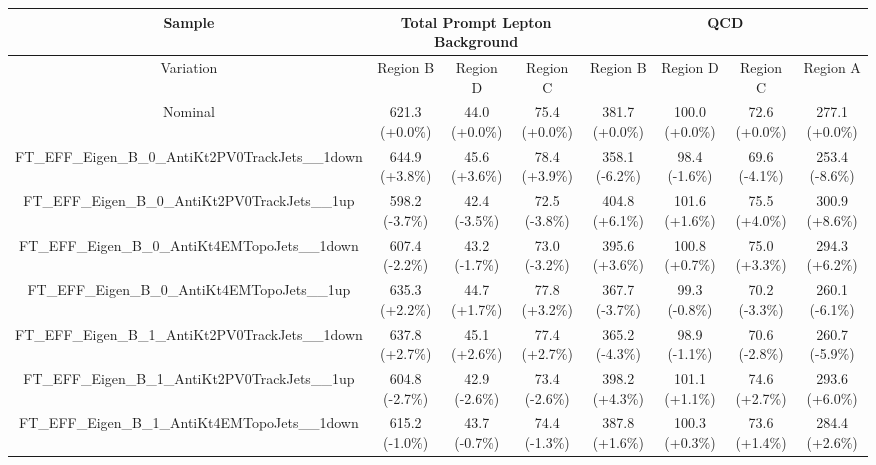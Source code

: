 \begin{table}[htbp!]
\begin{tiny}
\begin{center}
\begin{tabular}{c|c|c|c||c|c|c|c}
Sample                                                          &\multicolumn{3}{c||}{Total Prompt Lepton Background}      &\multicolumn{4}{c}{QCD}                                                  \\
\hline  
Variation                                                       & Region B       & Region D         & Region C           & Region B        & Region D         & Region C          & Region A         \\ 
\hline  
Nominal                                                      & 621.3     (+0.0\%) & 44.0      (+0.0\%) & 75.4      (+0.0\%) & 381.7     (+0.0\%) & 100.0     (+0.0\%) & 72.6      (+0.0\%) & 277.1     (+0.0\%) \\ 
\hline
FT\_EFF\_Eigen\_B\_0\_AntiKt2PV0TrackJets\_\_1down           & 644.9     (+3.8\%) & 45.6      (+3.6\%) & 78.4      (+3.9\%) & 358.1     (-6.2\%) & 98.4      (-1.6\%) & 69.6      (-4.1\%) & 253.4     (-8.6\%) \\ 
FT\_EFF\_Eigen\_B\_0\_AntiKt2PV0TrackJets\_\_1up             & 598.2     (-3.7\%) & 42.4      (-3.5\%) & 72.5      (-3.8\%) & 404.8     (+6.1\%) & 101.6     (+1.6\%) & 75.5      (+4.0\%) & 300.9     (+8.6\%) \\ 
FT\_EFF\_Eigen\_B\_0\_AntiKt4EMTopoJets\_\_1down             & 607.4     (-2.2\%) & 43.2      (-1.7\%) & 73.0      (-3.2\%) & 395.6     (+3.6\%) & 100.8     (+0.7\%) & 75.0      (+3.3\%) & 294.3     (+6.2\%) \\ 
FT\_EFF\_Eigen\_B\_0\_AntiKt4EMTopoJets\_\_1up               & 635.3     (+2.2\%) & 44.7      (+1.7\%) & 77.8      (+3.2\%) & 367.7     (-3.7\%) & 99.3      (-0.8\%) & 70.2      (-3.3\%) & 260.1     (-6.1\%) \\ 
FT\_EFF\_Eigen\_B\_1\_AntiKt2PV0TrackJets\_\_1down           & 637.8     (+2.7\%) & 45.1      (+2.6\%) & 77.4      (+2.7\%) & 365.2     (-4.3\%) & 98.9      (-1.1\%) & 70.6      (-2.8\%) & 260.7     (-5.9\%) \\ 
FT\_EFF\_Eigen\_B\_1\_AntiKt2PV0TrackJets\_\_1up             & 604.8     (-2.7\%) & 42.9      (-2.6\%) & 73.4      (-2.6\%) & 398.2     (+4.3\%) & 101.1     (+1.1\%) & 74.6      (+2.7\%) & 293.6     (+6.0\%) \\ 
FT\_EFF\_Eigen\_B\_1\_AntiKt4EMTopoJets\_\_1down             & 615.2     (-1.0\%) & 43.7      (-0.7\%) & 74.4      (-1.3\%) & 387.8     (+1.6\%) & 100.3     (+0.3\%) & 73.6      (+1.4\%) & 284.4     (+2.6\%) \\ 

\end{tabular}
\end{center}
\end{tiny}
\end{table}
